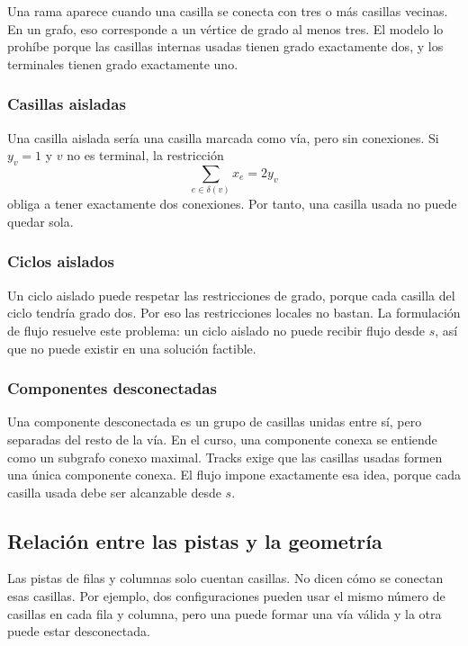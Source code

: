 Una rama aparece cuando una casilla se conecta con tres o más casillas vecinas. En un grafo, eso corresponde a un vértice de grado al menos tres. El modelo lo prohíbe porque las casillas internas usadas tienen grado exactamente dos, y los terminales tienen grado exactamente uno.

\subsubsection{Casillas aisladas}

Una casilla aislada sería una casilla marcada como vía, pero sin conexiones. Si \(y_v=1\) y \(v\) no es terminal, la restricción
\[
    \sum_{e \in \delta(v)} x_e = 2y_v
\]
obliga a tener exactamente dos conexiones. Por tanto, una casilla usada no puede quedar sola.

\subsubsection{Ciclos aislados}

Un ciclo aislado puede respetar las restricciones de grado, porque cada casilla del ciclo tendría grado dos. Por eso las restricciones locales no bastan. La formulación de flujo resuelve este problema: un ciclo aislado no puede recibir flujo desde \(s\), así que no puede existir en una solución factible.

\subsubsection{Componentes desconectadas}

Una componente desconectada es un grupo de casillas unidas entre sí, pero separadas del resto de la vía. En el curso, una componente conexa se entiende como un subgrafo conexo maximal. Tracks exige que las casillas usadas formen una única componente conexa. El flujo impone exactamente esa idea, porque cada casilla usada debe ser alcanzable desde \(s\).

\subsection{Relación entre las pistas y la geometría}

Las pistas de filas y columnas solo cuentan casillas. No dicen cómo se conectan esas casillas. Por ejemplo, dos configuraciones pueden usar el mismo número de casillas en cada fila y columna, pero una puede formar una vía válida y la otra puede estar desconectada.


